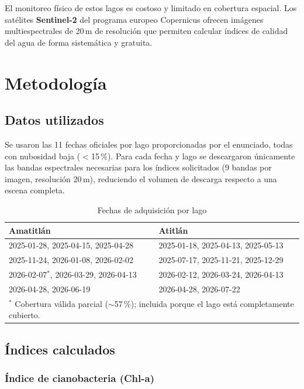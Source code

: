 \documentclass[12pt, a4paper]{article}
\begin{document}
El monitoreo físico de estos lagos es costoso y limitado en cobertura espacial. Los satélites
\textbf{Sentinel-2} del programa europeo Copernicus ofrecen imágenes multiespectrales de 20\,m
de resolución que permiten calcular índices de calidad del agua de forma sistemática y gratuita.

\section{Metodología}

\subsection{Datos utilizados}

Se usaron las 11 fechas oficiales por lago proporcionadas por el enunciado, todas con
nubosidad baja ($<$15\,\%). Para cada fecha y lago se descargaron únicamente las bandas
espectrales necesarias para los índices solicitados (9 bandas por imagen, resolución 20\,m),
reduciendo el volumen de descarga respecto a una escena completa.

\begin{table}[H]
\centering
\caption{Fechas de adquisición por lago}
\begin{tabular}{ll}
\toprule
\textbf{Amatitlán} & \textbf{Atitlán} \\
\midrule
2025-01-28, 2025-04-15, 2025-04-28 & 2025-01-18, 2025-04-13, 2025-05-13 \\
2025-11-24, 2026-01-08, 2026-02-02 & 2025-07-17, 2025-11-21, 2025-12-29 \\
2026-02-07$^*$, 2026-03-29, 2026-04-13 & 2026-02-12, 2026-03-24, 2026-04-13 \\
2026-04-28, 2026-06-19 & 2026-04-28, 2026-07-22 \\
\bottomrule
\multicolumn{2}{l}{\small $^*$ Cobertura válida parcial ($\sim$57\,\%); incluida porque el lago está completamente cubierto.}
\end{tabular}
\end{table}

\subsection{Índices calculados}

\subsubsection{Índice de cianobacteria (Chl-a)}
\end{document}
